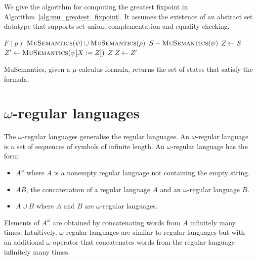 We give the algorithm for computing the greatest fixpoint in Algorithm~\ref{alg:mu_greatest_fixpoint}. It assumes the existence of an abstract set datatype that supports set union, complementation and equality checking.

\begin{algorithm}
\begin{algorithmic}

        \State\Return $F(p)$
    \ElsIf {$\phi = \psi \vee \rho$}
        \State\Return $\Call{MuSemantics}{\psi} \cup \Call{MuSemantics}{\rho}$
    \ElsIf {$\phi = \neg \psi$}
        \State\Return $S - \Call{MuSemantics}{\psi}$
        \State $Z \gets S$
        \Loop
            \State $Z' \gets \Call{MuSemantics}{\psi[X:=Z]}$
                \State\Return $Z$
            \EndIf
            \State $Z \gets Z'$
        \EndLoop
    \EndIf
\EndFunction

\end{algorithmic}
\caption{MuSemantics, given a $\mu$-calculus formula, returns the set of states that satisfy the formula.}
\label{a:mu_semantics}
\end{algorithm}

\section{$\omega$-regular languages}

The $\omega$-regular languages generalise the regular languages. An $\omega$-regular language is a set of sequences of symbols of infinite length. An $\omega$-regular language has the form:
\begin{itemize}
    \item $A^\omega$ where $A$ is a nonempty regular language not containing the empty string.
    \item $AB$, the concatenation of a regular language $A$ and an $\omega$-regular language $B$.
    \item $A \cup B$ where $A$ and $B$ are $\omega$-regular languages.
\end{itemize}

Elements of $A^\omega$ are obtained by concatenating words from $A$ infinitely many times. Intuitively, $\omega$-regular languages are similar to regular languages but with an additional $\omega$ operator that concatenates words from the regular language infinitely many times.

